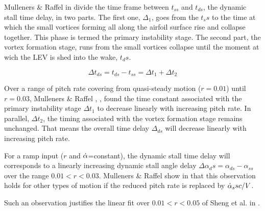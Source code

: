 Mulleners \& Raffel in \cite{mulleners_onset_2010} divide the time frame between $t_{ss}$ and $t_{ds}$, the dynamic stall time delay, in two parts. The first one, $\Delta_1$, goes from the $t_ss$ to the time at which the small vortices forming all along the airfoil surface rise and collapse together. This phase is termed the primary instability stage. The second part, the vortex formation stage, runs from the small vortices collapse until the moment at wich the LEV is shed into the wake, $t_ds$.

\begin{equation}
\Delta t_{ds} = t_{ds} - t_{ss}  = \Delta t_1 + \Delta t_2
\end{equation}

Over a range of pitch rate covering from quasi-steady motion ($r=0.01$) until $r=0.03$, Mulleners \& Raffel \cite{mulleners_onset_2010}, \cite{mulleners_dynamic_2012}, \cite{mulleners_dynamic_2013} found the time constant associated with the primary instability stage $\Delta t_1$ to decrease linearly with increasing pitch rate. In parallel, $\Delta t_2$, the timing associated with the vortex formation stage remains unchanged. That means the overall time delay $\Delta _{ds}$ will decrease linearly with increasing pitch rate. 

For a ramp input ($r$ and $\dot{\alpha}$=constant), the dynamic stall time delay will corresponds to a linearly increasing dynamic stall angle delay $\Delta \alpha_ds = \alpha_{ds} - \alpha_{ss}$ over the range $0.01<r<0.03$. Mulleners \& Raffel show in \cite{mulleners_onset_2012} that this observation holds for other types of motion if the reduced pitch rate is replaced by $\dot{\alpha}_ss c /V$.

Such an observation justifies the linear fit over $0.01<r<0.05$ of Sheng et al. in \cite{sheng_new_2006}.

